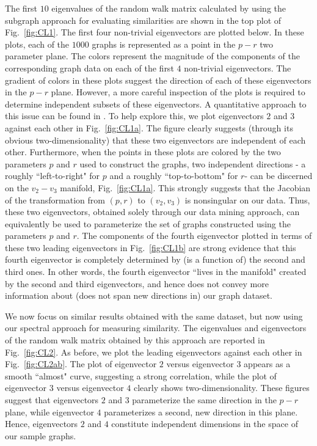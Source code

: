 The first $10$ eigenvalues of the random walk matrix calculated by
using the subgraph approach for evaluating similarities are shown in
the top plot of Fig.~\ref{fig:CL1}.
% 
The first four non-trivial eigenvectors are plotted below.
% 
In these plots, each of the $1000$ graphs is represented as a point in
the $p-r$ two parameter plane.
% 
The colors represent the magnitude of the components of the
corresponding graph data on each of the first $4$ non-trivial
eigenvectors.
% 
The gradient of colors in these plots suggest the direction of each of
these eigenvectors in the $p-r$ plane.
% 
However, a more careful inspection of the plots is required to
determine independent subsets of these eigenvectors. A quantitative
approach to this issue can be found in \cite{dsilva_parsimonious_2015}.
% 
To help explore this, we plot eigenvectors $2$ and $3$ against each
other in Fig.~\ref{fig:CL1a}.
% 
The figure clearly suggests (through its obvious two-dimensionality)
that these two eigenvectors are independent of each other.
% 
Furthermore, when the points in these plots are colored by the two
parameters $p$ and $r$ used to construct the graphs, two independent
directions - a roughly ``left-to-right" for $p$ and a roughly
``top-to-bottom" for $r$- can be discerned on the $v_2 - v_3$
manifold, Fig.~\ref{fig:CL1a}.
% 
This strongly suggests that the Jacobian of the transformation from
$(p,r)$ to $(v_2,v_3)$ is nonsingular on our data.
% 
Thus, these two eigenvectors, obtained solely through our data mining
approach, can equivalently be used to parameterize the set of graphs
constructed using the parameters $p$ and $r$.
% 
The components of the fourth eigenvector plotted in terms of these two
leading eigenvectors in Fig.~\ref{fig:CL1b} are strong evidence that
this fourth eigenvector is completely determined by (is a function of)
the second and third ones.
% 
In other words, the fourth eigenvector ``lives in the manifold"
created by the second and third eigenvectors, and hence does not
convey more information about (does not span new directions in) our
graph dataset.


We now focus on similar results obtained with the same dataset, but
now using our spectral approach for measuring similarity.
% 
The eigenvalues and eigenvectors of the random walk matrix obtained by
this approach are reported in Fig.~\ref{fig:CL2}.
% 
As before, we plot the leading eigenvectors against each other in
Fig.~\ref{fig:CL2ab}.
% 
The plot of eigenvector $2$ versus eigenvector $3$ appears as a smooth
``almost" curve, suggesting a strong correlation, while the plot of
eigenvector $3$ versus eigenvector $4$ clearly shows
two-dimensionality.
% 
These figures suggest that eigenvectors $2$ and $3$ parameterize the
same direction in the $p-r$ plane, while eigenvector $4$ parameterizes
a second, new direction in this plane.
% 
Hence, eigenvectors $2$ and $4$ constitute independent dimensions in
the space of our sample graphs.
% 

